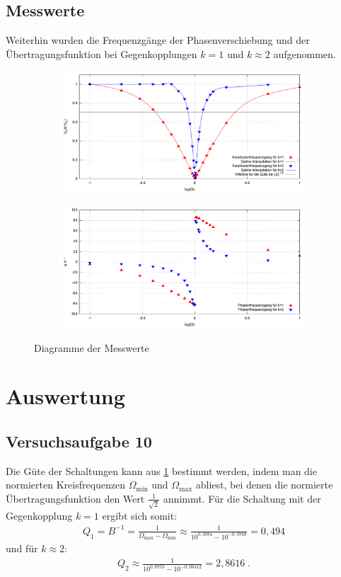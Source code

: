 \documentclass[numbers=noenddot,12pt,a4paper]{scrartcl}
\newcommand{\ix}[1]{_\text{#1}}
\begin{document}
\subsection{Messwerte}
Weiterhin wurden die Frequenzgänge der Phasenverschiebung und der Übertragungsfunktion bei Gegenkopplungen $k=1$ und $k\approx2$ aufgenommen.
\begin{figure}[H]
\centering
\begin{subfigure}[b]{\textwidth}
\includegraphics[width=\textwidth]{sfg.pdf}
 \label{img:sfg}
\end{subfigure}
\begin{subfigure}[b]{\textwidth}
\includegraphics[width=\textwidth]{pfg.pdf}
\end{subfigure}
\caption{Diagramme der Messwerte}
\end{figure}
\section{Auswertung}
\subsection{Versuchsaufgabe 10}
Die Güte der Schaltungen kann aus \ref{img:sfg} bestimmt werden, indem man die normierten Kreisfrequenzen $\Omega\ix{min}$ und $\Omega\ix{max}$ abliest, bei denen die normierte Übertragungsfunktion den Wert $\frac{1}{\sqrt{2}}$ annimmt. Für die Schaltung mit der Gegenkopplung $k=1$ ergibt sich somit: 
\begin{align*}
Q_1=B^{-1}=\frac{1}{\Omega\ix{max}-\Omega\ix{min}}\approx\frac{1}{10^{0,3884}-10^{-0,3768}}=0,494
\end{align*}
und für $k\approx2$:
\begin{align*}
Q_2\approx\frac{1}{10^{0,0755}-10^{-0,06412}}=2,8616 \; .
\end{align*}
\end{document}
